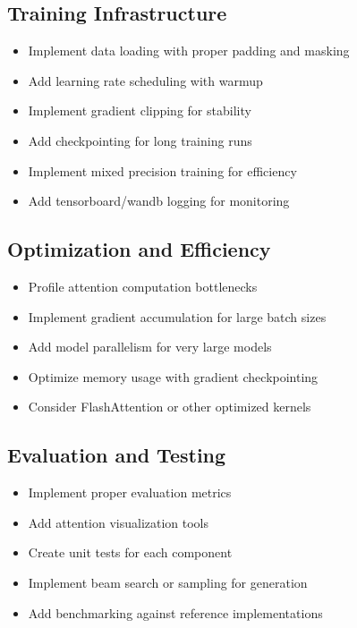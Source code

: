 \documentclass[11pt]{article}
\begin{document}
\subsection{Training Infrastructure}
\begin{itemize}
    \item[$\square$] Implement data loading with proper padding and masking
    \item[$\square$] Add learning rate scheduling with warmup
    \item[$\square$] Implement gradient clipping for stability
    \item[$\square$] Add checkpointing for long training runs
    \item[$\square$] Implement mixed precision training for efficiency
    \item[$\square$] Add tensorboard/wandb logging for monitoring
\end{itemize}

\subsection{Optimization and Efficiency}
\begin{itemize}
    \item[$\square$] Profile attention computation bottlenecks
    \item[$\square$] Implement gradient accumulation for large batch sizes
    \item[$\square$] Add model parallelism for very large models
    \item[$\square$] Optimize memory usage with gradient checkpointing
    \item[$\square$] Consider FlashAttention or other optimized kernels
\end{itemize}

\subsection{Evaluation and Testing}
\begin{itemize}
    \item[$\square$] Implement proper evaluation metrics
    \item[$\square$] Add attention visualization tools
    \item[$\square$] Create unit tests for each component
    \item[$\square$] Implement beam search or sampling for generation
    \item[$\square$] Add benchmarking against reference implementations
\end{itemize}
\end{document}
